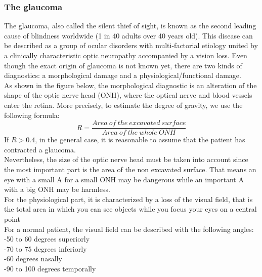 \documentclass[english,12pt]{article}
\begin{document}
\subsubsection{The glaucoma}
The glaucoma, also called the silent thief of sight, is known as the second leading cause of blindness worldwide (1 in 40 adults over 40 years old). This disease can be described as a group of ocular disorders with multi-factorial etiology united by a clinically characteristic optic neuropathy accompanied by a vision loss. Even though the exact origin of glaucoma is not known yet, there are two kinds of diagnostics: a morphological damage and a physiological/functional damage.\\
As shown in the figure below, the morphological diagnostic is an alteration of the shape of the optic nerve head (ONH), where the optical nerve and blood vessels enter the retina.
 More precisely, to estimate the degree of gravity, we use the following formula:
$$ R=\frac{Area\ of\ the\ excavated\ surface}{Area\ of\ the\ whole\ ONH}$$
If $R>0.4$, in the general case, it is reasonable to assume that the patient has contracted a glaucoma.\\
Nevertheless, the size of the optic nerve head must be taken into account since the most important part is the area of the non excavated surface. That means an eye with a small A for a small ONH may be dangerous while an important A with a big ONH may be harmless.\\

For the physiological part, it is characterized by a loss of the visual field, that is the total area in which you can see objects while you focus your eyes on a central point\\
For a normal patient, the visual field can be described with the following angles:\\
-50 to 60 degrees superiorly\\
-70 to 75 degrees inferiorly\\
-60 degrees nasally\\
-90 to 100 degrees temporally\\
\end{document}
